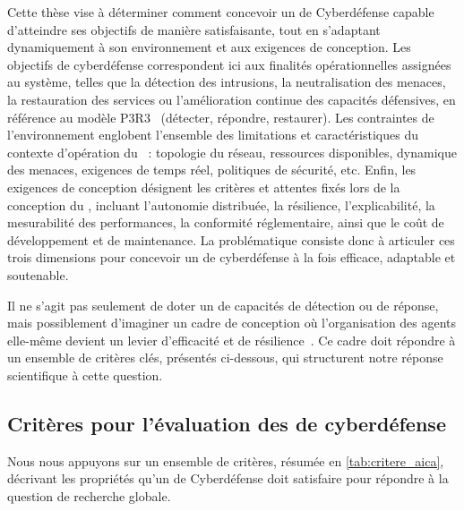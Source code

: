 Cette thèse vise à déterminer comment concevoir un  de Cyberdéfense capable d'atteindre ses objectifs de manière satisfaisante, tout en s'adaptant dynamiquement à son environnement et aux exigences de conception. Les objectifs de cyberdéfense correspondent ici aux finalités opérationnelles assignées au système, telles que la détection des intrusions, la neutralisation des menaces, la restauration des services ou l'amélioration continue des capacités défensives, en référence au modèle P3R3~\cite{Theron2013P3R3} (détecter, répondre, restaurer). Les contraintes de l'environnement englobent l'ensemble des limitations et caractéristiques du contexte d'opération du ~: topologie du réseau, ressources disponibles, dynamique des menaces, exigences de temps réel, politiques de sécurité, etc. Enfin, les exigences de conception désignent les critères et attentes fixés lors de la conception du , incluant l'autonomie distribuée, la résilience, l'explicabilité, la mesurabilité des performances, la conformité réglementaire, ainsi que le coût de développement et de maintenance. La problématique consiste donc à articuler ces trois dimensions pour concevoir un  de cyberdéfense à la fois efficace, adaptable et soutenable.

\medskip

\noindent
Il ne s'agit pas seulement de doter un  de capacités de détection ou de réponse, mais possiblement d'imaginer un cadre de conception où l'organisation des agents elle-même devient un levier d'efficacité et de résilience~\cite{Picard2006, DiMarzoSerugendo2006}. Ce cadre doit répondre à un ensemble de critères clés, présentés ci-dessous, qui structurent notre réponse scientifique à cette question.

\subsection*{Critères pour l'évaluation des  de cyberdéfense}

%         

Nous nous appuyons sur un ensemble de critères, résumée en \autoref{tab:critere_aica}, décrivant les propriétés qu'un  de Cyberdéfense doit satisfaire pour répondre à la question de recherche globale.

